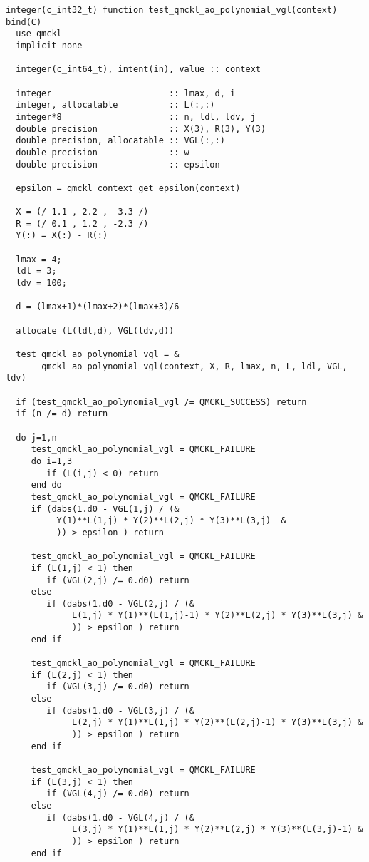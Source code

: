 \begin{verbatim}
integer(c_int32_t) function test_qmckl_ao_polynomial_vgl(context) bind(C)
  use qmckl
  implicit none

  integer(c_int64_t), intent(in), value :: context

  integer                       :: lmax, d, i
  integer, allocatable          :: L(:,:)
  integer*8                     :: n, ldl, ldv, j
  double precision              :: X(3), R(3), Y(3)
  double precision, allocatable :: VGL(:,:)
  double precision              :: w
  double precision              :: epsilon

  epsilon = qmckl_context_get_epsilon(context)

  X = (/ 1.1 , 2.2 ,  3.3 /)
  R = (/ 0.1 , 1.2 , -2.3 /)
  Y(:) = X(:) - R(:)

  lmax = 4;
  ldl = 3;
  ldv = 100;

  d = (lmax+1)*(lmax+2)*(lmax+3)/6

  allocate (L(ldl,d), VGL(ldv,d))

  test_qmckl_ao_polynomial_vgl = &
       qmckl_ao_polynomial_vgl(context, X, R, lmax, n, L, ldl, VGL, ldv)

  if (test_qmckl_ao_polynomial_vgl /= QMCKL_SUCCESS) return
  if (n /= d) return

  do j=1,n
     test_qmckl_ao_polynomial_vgl = QMCKL_FAILURE
     do i=1,3
        if (L(i,j) < 0) return
     end do
     test_qmckl_ao_polynomial_vgl = QMCKL_FAILURE
     if (dabs(1.d0 - VGL(1,j) / (&
          Y(1)**L(1,j) * Y(2)**L(2,j) * Y(3)**L(3,j)  &
          )) > epsilon ) return

     test_qmckl_ao_polynomial_vgl = QMCKL_FAILURE
     if (L(1,j) < 1) then
        if (VGL(2,j) /= 0.d0) return
     else
        if (dabs(1.d0 - VGL(2,j) / (&
             L(1,j) * Y(1)**(L(1,j)-1) * Y(2)**L(2,j) * Y(3)**L(3,j) &
             )) > epsilon ) return
     end if

     test_qmckl_ao_polynomial_vgl = QMCKL_FAILURE
     if (L(2,j) < 1) then
        if (VGL(3,j) /= 0.d0) return
     else
        if (dabs(1.d0 - VGL(3,j) / (&
             L(2,j) * Y(1)**L(1,j) * Y(2)**(L(2,j)-1) * Y(3)**L(3,j) &
             )) > epsilon ) return
     end if

     test_qmckl_ao_polynomial_vgl = QMCKL_FAILURE
     if (L(3,j) < 1) then
        if (VGL(4,j) /= 0.d0) return
     else
        if (dabs(1.d0 - VGL(4,j) / (&
             L(3,j) * Y(1)**L(1,j) * Y(2)**L(2,j) * Y(3)**(L(3,j)-1) &
             )) > epsilon ) return
     end if


\end{verbatim}
